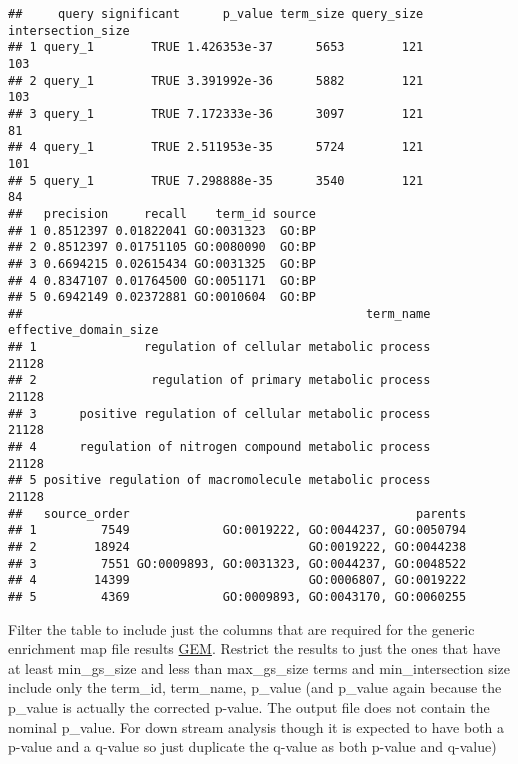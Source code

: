 \documentclass[
]{book}
\newenvironment{Shaded}{\begin{snugshade}}{\end{snugshade}}
\newcommand{\CommentTok}[1]{\textcolor[rgb]{0.56,0.35,0.01}{\textit{#1}}}
\newcommand{\DecValTok}[1]{\textcolor[rgb]{0.00,0.00,0.81}{#1}}
\newcommand{\NormalTok}[1]{#1}
\newcommand{\OtherTok}[1]{\textcolor[rgb]{0.56,0.35,0.01}{#1}}
\newcommand{\SpecialCharTok}[1]{\textcolor[rgb]{0.00,0.00,0.00}{#1}}
\begin{document}
\begin{Shaded}
\end{Shaded}

\begin{verbatim}
##     query significant      p_value term_size query_size intersection_size
## 1 query_1        TRUE 1.426353e-37      5653        121               103
## 2 query_1        TRUE 3.391992e-36      5882        121               103
## 3 query_1        TRUE 7.172333e-36      3097        121                81
## 4 query_1        TRUE 2.511953e-35      5724        121               101
## 5 query_1        TRUE 7.298888e-35      3540        121                84
##   precision     recall    term_id source
## 1 0.8512397 0.01822041 GO:0031323  GO:BP
## 2 0.8512397 0.01751105 GO:0080090  GO:BP
## 3 0.6694215 0.02615434 GO:0031325  GO:BP
## 4 0.8347107 0.01764500 GO:0051171  GO:BP
## 5 0.6942149 0.02372881 GO:0010604  GO:BP
##                                                term_name effective_domain_size
## 1               regulation of cellular metabolic process                 21128
## 2                regulation of primary metabolic process                 21128
## 3      positive regulation of cellular metabolic process                 21128
## 4      regulation of nitrogen compound metabolic process                 21128
## 5 positive regulation of macromolecule metabolic process                 21128
##   source_order                                        parents
## 1         7549             GO:0019222, GO:0044237, GO:0050794
## 2        18924                         GO:0019222, GO:0044238
## 3         7551 GO:0009893, GO:0031323, GO:0044237, GO:0048522
## 4        14399                         GO:0006807, GO:0019222
## 5         4369             GO:0009893, GO:0043170, GO:0060255
\end{verbatim}

Filter the table to include just the columns that are required for the generic enrichment map file results \href{https://enrichmentmap.readthedocs.io/en/latest/FileFormats.html\#generic-results-files}{GEM}. Restrict the results to just the ones that have at least min\_gs\_size and less than max\_gs\_size terms and min\_intersection size include only the term\_id, term\_name, p\_value (and p\_value again because the p\_value is actually the corrected p-value. The output file does not contain the nominal p\_value. For down stream analysis though it is expected to have both a p-value and a q-value so just duplicate the q-value as both p-value and q-value)
\end{document}

